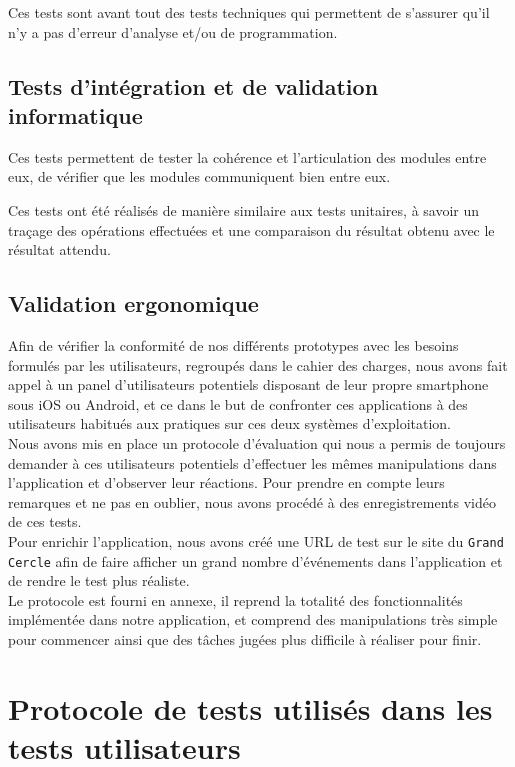 \documentclass[a4paper, 11px]{article}
\begin{document}
Ces tests sont avant tout des tests techniques qui permettent de s'assurer qu'il n'y a pas d'erreur d'analyse et/ou de programmation.

\subsection{Tests d'intégration et de validation informatique}
Ces tests permettent de tester la cohérence et l'articulation des modules entre eux, de vérifier que les modules communiquent bien entre eux.


Ces tests ont été réalisés de manière similaire aux tests unitaires, à savoir un traçage des opérations effectuées et une comparaison du résultat obtenu avec le résultat attendu.

\subsection{Validation ergonomique}
Afin de vérifier la conformité de nos différents prototypes avec les besoins formulés par les utilisateurs, regroupés dans le cahier des charges, nous avons fait appel à un panel d'utilisateurs potentiels disposant de leur propre smartphone sous iOS ou Android, et ce dans le but de confronter ces applications à des utilisateurs habitués aux pratiques sur ces deux systèmes d'exploitation.\\

Nous avons mis en place un protocole d'évaluation qui nous a permis de toujours demander à ces utilisateurs potentiels d'effectuer les mêmes manipulations dans l'application et d'observer leur réactions. Pour prendre en compte leurs remarques et ne pas en oublier, nous avons procédé à des enregistrements vidéo de ces tests.\\
Pour enrichir l'application, nous avons créé une URL de test sur le site du \texttt{Grand Cercle} afin de faire afficher un grand nombre d'événements dans l'application et de rendre le test plus réaliste.\\

Le protocole est fourni en annexe, il reprend la totalité des fonctionnalités implémentée dans notre application, et comprend des manipulations très simple pour commencer ainsi que des tâches jugées plus difficile à réaliser pour finir.


\appendix
\addappheadtotoc

\newpage

\section{Protocole de tests utilisés dans les tests utilisateurs}
\label{protocole}
\end{document}
